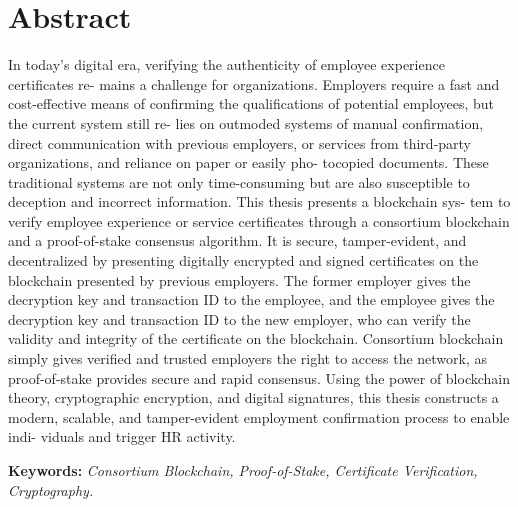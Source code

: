 \chapter*{Abstract} %

In today’s digital era, verifying the authenticity of employee experience certificates re-
mains a challenge for organizations. Employers require a fast and cost-effective means
of confirming the qualifications of potential employees, but the current system still re-
lies on outmoded systems of manual confirmation, direct communication with previous
employers, or services from third-party organizations, and reliance on paper or easily pho-
tocopied documents. These traditional systems are not only time-consuming but are also
susceptible to deception and incorrect information. This thesis presents a blockchain sys-
tem to verify employee experience or service certificates through a consortium blockchain
and a proof-of-stake consensus algorithm. It is secure, tamper-evident, and decentralized
by presenting digitally encrypted and signed certificates on the blockchain presented by
previous employers. The former employer gives the decryption key and transaction ID to
the employee, and the employee gives the decryption key and transaction ID to the new
employer, who can verify the validity and integrity of the certificate on the blockchain.
Consortium blockchain simply gives verified and trusted employers the right to access
the network, as proof-of-stake provides secure and rapid consensus. Using the power of
blockchain theory, cryptographic encryption, and digital signatures, this thesis constructs
a modern, scalable, and tamper-evident employment confirmation process to enable indi-
viduals and trigger HR activity.

\vspace{0.5cm} %

\noindent \textbf{Keywords:} \textit{Consortium Blockchain, Proof-of-Stake, Certificate Verification, Cryptography.}